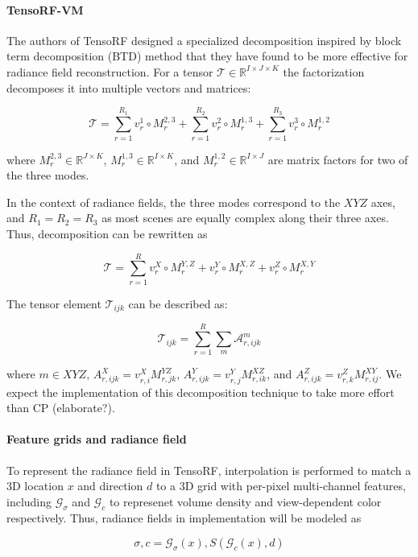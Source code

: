 \documentclass[conference]{IEEEtran}
\begin{document}
\paragraph{TensoRF-VM} The authors of TensoRF designed a specialized decomposition
inspired by block term decomposition (BTD)
method that they have found to be more effective for radiance field reconstruction.
For a tensor \(\mathcal{T} \in \mathbb{R}^{I \times J \times K}\) the factorization decomposes it into multiple vectors and
matrices:

\[\mathcal{T} = \sum_{r=1}^{R_1}v_{r}^{1} \circ M_{r}^{2,3} + \sum_{r=1}^{R_2}v_{r}^{2} \circ M_{r}^{1,3} + \sum_{r=1}^{R_3}v_{r}^{3} \circ M_{r}^{1,2}\]

where \(M_{r}^{2,3} \in \mathbb{R}^{J \times K}\),
\(M_{r}^{1,3} \in \mathbb{R}^{I \times K}\), and
\(M_{r}^{1,2} \in \mathbb{R}^{I \times J}\) are matrix factors for two of the three modes.

In the context of radiance fields, the three modes correspond to the \(XYZ\) axes,
and \(R_1 = R_2 = R_3\) as most scenes are equally complex along their three axes.
Thus, decomposition can be rewritten as

\[\mathcal{T} = \sum_{r=1}^{R}v_{r}^{X} \circ M_{r}^{Y,Z} + v_{r}^{Y} \circ M_{r}^{X,Z} + v_{r}^{Z} \circ M_{r}^{X,Y}\]

The tensor element \(\mathcal{T}_{ijk} \) can be described as:

\[\mathcal{T}_{ijk} = \sum_{r=1}^{R} \sum_{m} \mathcal{A}^{m}_{r,ijk}\]

where \(m \in XYZ\), \(A_{r,ijk}^{X} = v_{r,i}^{X}M_{r,jk}^{YZ}\),
\(A_{r,ijk}^{Y} = v_{r,j}^{Y}M_{r,ik}^{XZ}\), and
\(A_{r,ijk}^{Z} = v_{r,k}^{Z}M_{r,ij}^{XY}\). We expect the implementation of this
decomposition technique to take more effort than CP (elaborate?).

\paragraph{Feature grids and radiance field} To represent the radiance field
in TensoRF, interpolation is performed to match a 3D location \(x\) and direction
\(d\) to a 3D grid  with per-pixel multi-channel features, including
\(\mathcal{G}_{\sigma}\) and \(\mathcal{G}_{c}\) to represenet volume density and
view-dependent color respectively. Thus, radiance fields in
implementation will be modeled as

\[\sigma,c = \mathcal{G}_{\sigma}(x), S(\mathcal{G}_{c}(x), d)\]
\end{document}
